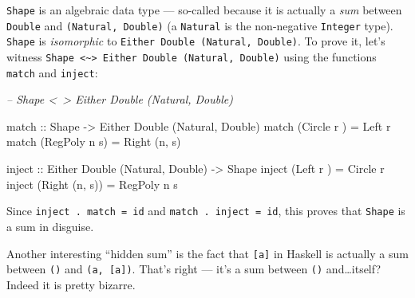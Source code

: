 \documentclass[]{article}
\newenvironment{Shaded}{}{}
\newcommand{\CommentTok}[1]{\textcolor[rgb]{0.38,0.63,0.69}{\textit{#1}}}
\newcommand{\DataTypeTok}[1]{\textcolor[rgb]{0.56,0.13,0.00}{#1}}
\newcommand{\FunctionTok}[1]{\textcolor[rgb]{0.02,0.16,0.49}{#1}}
\newcommand{\NormalTok}[1]{#1}
\newcommand{\OtherTok}[1]{\textcolor[rgb]{0.00,0.44,0.13}{#1}}
\begin{document}
\texttt{Shape} is an algebraic data type --- so-called because it is actually a
\emph{sum} between \texttt{Double} and \texttt{(Natural,\ Double)} (a
\texttt{Natural} is the non-negative \texttt{Integer} type). \texttt{Shape} is
\emph{isomorphic} to \texttt{Either\ Double\ (Natural,\ Double)}. To prove it,
let's witness
\texttt{Shape\ \textless{}\textasciitilde{}\textgreater{}\ Either\ Double\ (Natural,\ Double)}
using the functions \texttt{match} and \texttt{inject}:

\begin{Shaded}
\begin{Highlighting}[]
\CommentTok{-- Shape <~> Either Double (Natural, Double)}

\OtherTok{match ::} \DataTypeTok{Shape} \OtherTok{->} \DataTypeTok{Either} \DataTypeTok{Double}\NormalTok{ (}\DataTypeTok{Natural}\NormalTok{, }\DataTypeTok{Double}\NormalTok{)}
\NormalTok{match (}\DataTypeTok{Circle}\NormalTok{  r  ) }\FunctionTok{=} \DataTypeTok{Left}\NormalTok{ r}
\NormalTok{match (}\DataTypeTok{RegPoly}\NormalTok{ n s) }\FunctionTok{=} \DataTypeTok{Right}\NormalTok{ (n, s)}

\OtherTok{inject ::} \DataTypeTok{Either} \DataTypeTok{Double}\NormalTok{ (}\DataTypeTok{Natural}\NormalTok{, }\DataTypeTok{Double}\NormalTok{) }\OtherTok{->} \DataTypeTok{Shape}
\NormalTok{inject (}\DataTypeTok{Left}\NormalTok{   r    ) }\FunctionTok{=} \DataTypeTok{Circle}\NormalTok{  r}
\NormalTok{inject (}\DataTypeTok{Right}\NormalTok{ (n, s)) }\FunctionTok{=} \DataTypeTok{RegPoly}\NormalTok{ n s}
\end{Highlighting}
\end{Shaded}

Since \texttt{inject\ .\ match\ =\ id} and \texttt{match\ .\ inject\ =\ id},
this proves that \texttt{Shape} is a sum in disguise.

Another interesting ``hidden sum'' is the fact that \texttt{{[}a{]}} in Haskell
is actually a sum between \texttt{()} and \texttt{(a,\ {[}a{]})}. That's right
--- it's a sum between \texttt{()} and\ldots{}itself? Indeed it is pretty
bizarre.
\end{document}
